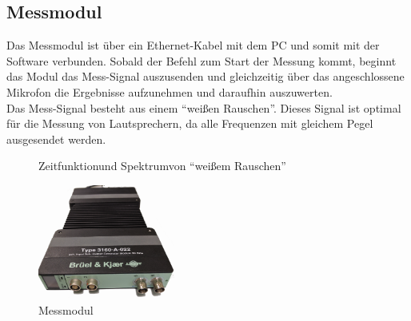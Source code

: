 \newpage
\subsection*{Messmodul}\label{subsec:4.1.2}
Das Messmodul ist über ein Ethernet-Kabel mit dem PC und somit mit der Software verbunden.
Sobald der Befehl zum Start der Messung kommt, beginnt das Modul das Mess-Signal auszusenden und gleichzeitig über das angeschlossene Mikrofon die Ergebnisse aufzunehmen und daraufhin auszuwerten.
\\
Das Mess-Signal besteht aus einem \enquote{weißen Rauschen}.
Dieses Signal ist optimal für die Messung von Lautsprechern, da alle Frequenzen mit gleichem Pegel ausgesendet werden.
\begin{figure} [H]
	\centering
	\caption[Zeitfunktion und Spektrum von \enquote{weißem Rauschen}]{Zeitfunktion\footnotemark und Spektrum\footnotemark von \enquote{weißem Rauschen}}
	\label{fig:4.1.2.1}
\end{figure}
\begin{figure} [H]
	\centering
	\includegraphics[width=0.4\textwidth]{img/LSMessung/modul_front.png}
	\caption{Messmodul}
	\label{fig:4.1.2.2}
\end{figure}

